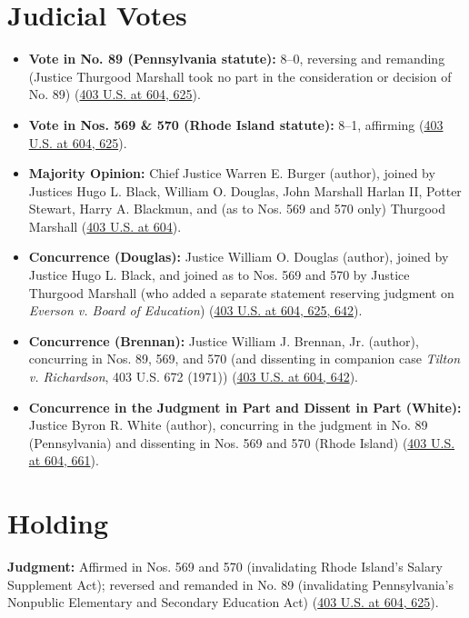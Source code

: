 \documentclass[12pt]{article}
\begin{document}
\section{Judicial Votes}
\begin{itemize}
\item \textbf{Vote in No. 89 (Pennsylvania statute):} 8--0, reversing and remanding (Justice Thurgood Marshall took no part in the consideration or decision of No. 89) (\href{https://supreme.justia.com/cases/federal/us/403/602/}{403 U.S. at 604, 625}).
\item \textbf{Vote in Nos. 569 \& 570 (Rhode Island statute):} 8--1, affirming (\href{https://supreme.justia.com/cases/federal/us/403/602/}{403 U.S. at 604, 625}).
\item \textbf{Majority Opinion:} Chief Justice Warren E. Burger (author), joined by Justices Hugo L. Black, William O. Douglas, John Marshall Harlan II, Potter Stewart, Harry A. Blackmun, and (as to Nos. 569 and 570 only) Thurgood Marshall (\href{https://supreme.justia.com/cases/federal/us/403/602/}{403 U.S. at 604}).
\item \textbf{Concurrence (Douglas):} Justice William O. Douglas (author), joined by Justice Hugo L. Black, and joined as to Nos. 569 and 570 by Justice Thurgood Marshall (who added a separate statement reserving judgment on \textit{Everson v. Board of Education}) (\href{https://supreme.justia.com/cases/federal/us/403/602/}{403 U.S. at 604, 625, 642}).
\item \textbf{Concurrence (Brennan):} Justice William J. Brennan, Jr. (author), concurring in Nos. 89, 569, and 570 (and dissenting in companion case \textit{Tilton v. Richardson}, 403 U.S. 672 (1971)) (\href{https://supreme.justia.com/cases/federal/us/403/602/}{403 U.S. at 604, 642}).
\item \textbf{Concurrence in the Judgment in Part and Dissent in Part (White):} Justice Byron R. White (author), concurring in the judgment in No. 89 (Pennsylvania) and dissenting in Nos. 569 and 570 (Rhode Island) (\href{https://supreme.justia.com/cases/federal/us/403/602/}{403 U.S. at 604, 661}).
\end{itemize}

\section{Holding}
\textbf{Judgment:} Affirmed in Nos. 569 and 570 (invalidating Rhode Island's Salary Supplement Act); reversed and remanded in No. 89 (invalidating Pennsylvania's Nonpublic Elementary and Secondary Education Act) (\href{https://supreme.justia.com/cases/federal/us/403/602/}{403 U.S. at 604, 625}).
\end{document}
